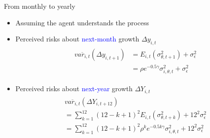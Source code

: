 \documentclass{beamer}
\begin{document}
\begin{frame}{From monthly to yearly }
	\begin{itemize}
		\item Assuming the agent understands the process 
	\end{itemize}
	\begin{itemize}
		\item Perceived risks about \textcolor{blue}{next-month} growth $\Delta y_{i,t}$
		\begin{eqnarray*}
			\begin{split}
				& \overline {var_{i,t}}(\Delta y_{i,t+1}) & = E_{i,t}( {\sigma^2_{\theta,t+1}}) + \sigma^2_{\epsilon} \\
				& & = \rho e^{-0.5\gamma} \sigma^2_{i,\theta,t}  + \sigma^2_{\epsilon} 
			\end{split}
		\end{eqnarray*}
		
		\item Perceived risks about \textcolor{blue}{next-year} growth $\Delta Y_{i,t}$
		\begin{eqnarray*}
			\begin{split}
				& \overline {var_{i,t}}(\Delta Y_{i,t+12}) \\
				& = \sum^{12}_{k=1} (12-k+1)^2 E_{i,t}( {\sigma^2_{\theta,t+k}}) + 12^2 \sigma^2_{\epsilon} \\ 
				& = \sum^{12}_{k=1} (12-k+1)^2 \rho^k e^{-0.5k\gamma} \sigma^2_{i,\theta,t}+ 12^2 \sigma^2_{\epsilon}  	 
			\end{split}
		\end{eqnarray*}
	\end{itemize}
\end{frame}

\end{document}
